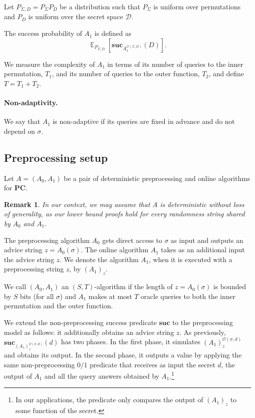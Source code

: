 \documentclass[11pt]{article}
\newtheorem{remark}[theorem]{Remark}
\DeclareMathOperator*{\E}{\mathbb{E}}
\newcommand{\SECS}{{\mathcal{D}}}
\newcommand{\secv}{{d}}
\newcommand{\SECV}{{D}}
\newcommand{\SUC}{\boldsymbol{suc}}
\newcommand{\PC}{\boldsymbol{PC}}
\begin{document}
Let $P_{\Sigma,\SECV} = P_{\Sigma} P_{\SECV}$ be a distribution such that $P_{\Sigma}$ is uniform over permutations
and $P_\SECV$ is uniform over the secret space $\SECS$.

The success probability of $A_1$ is defined as
$$\E_{P_{\Sigma,\SECV}}[\SUC_{A_1^{ \mathcal{O}(\Sigma,\SECV)} }(\SECV)].$$

We measure the complexity of $A_1$ in terms of its number of queries to the inner permutation, $T_1$, and its number of queries to the outer function, $T_2$, and define $T = T_1 + T_2$.


\paragraph{Non-adaptivity.}
We say that $A_1$ is non-adaptive if its queries are fixed in advance and do not depend on $\sigma$. 

\subsection{Preprocessing setup}
\label{subsec:preprocess setup}

Let $A = (A_0,A_1)$ be a pair of deterministic preprocessing and online algorithms for $\PC$. 
\begin{remark}
\label{rem:deterministic}
In our context, we may assume that $A$ is deterministic without loss of generality, as our lower bound proofs hold for every randomness string shared by $A_0$ and $A_1$.
\end{remark}

The preprocessing algorithm $A_0$ gets direct access to $\sigma$ as input and outputs an advice string $z=A_0(\sigma)$.
The online algorithm $A_1$ takes as an additional input the advice string $z$. We denote the algorithm $A_1$, when it is executed with a preprocessing string $z$, by $(A_1)_{z}$.

We call $(A_0,A_1)$ an $(S,T)$-algorithm if the length of $z = A_0(\sigma)$ is bounded by $S$ bits (for all $\sigma$) and $A_1$ makes at most $T$ oracle queries to both the inner permutation and the outer function. 

We extend the non-preprocessing success predicate $\SUC$ to the preprocessing model as follows: 
it additionally obtains an advice string $z$.
As previously, 
$\SUC_{(A_1)_{z}^{\mathcal{O}(\sigma,\secv)}}(\secv)$ has two phases. In the first phase, it simulates $(A_1)_z^{\mathcal{O}(\sigma,\secv)}$ and obtains its output. 
In the second phase, it outputs a value by applying the same non-preprocessing $0/1$ predicate that receives as input the secret $\secv$, the output of $A_1$ and all the query answers obtained by $A_1$.\footnote{In our applications, the predicate only compares the output of $(A_1)_z$ to some function of the secret.} 
\end{document}
